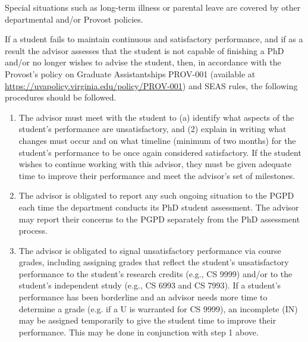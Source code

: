 Special situations such as long-term illness or parental leave are
covered by other departmental and/or Provost policies.

If a student fails to maintain continuous and satisfactory performance, 
and if as a result the advisor 
assesses that the student is not capable of finishing a PhD and/or no longer wishes to advise the student, then, in accordance with the Provost's policy
on Graduate Assistantships PROV-001 (available at
\href{https://uvapolicy.virginia.edu/policy/PROV-001}{{https://uvapolicy.virginia.edu/policy/PROV-001}})
and SEAS rules, the following procedures should be followed.

\begin{enumerate}
    \item 
The advisor must meet with the student to (a) identify what
aspects of the student's performance are unsatisfactory, and (2) explain
in writing what changes must occur and on what timeline (minimum of two
months) for the student's performance to be once again considered
satisfactory. If the student wishes to continue working with this
advisor, they must be given adequate time to improve their performance
and meet the advisor's set of milestones.

\item The advisor is obligated to report any such ongoing situation
to the PGPD each time the department
conducts its PhD student assessment. 
The advisor may report their concerns to the PGPD separately from the PhD assessment process.

\item 
The advisor is obligated to signal unsatisfactory performance via course grades, 
including assigning grades that reflect the student's unsatisfactory performance
to the student's research credits (e.g., CS 9999) and/or to the student's independent study (e.g., CS 6993 and CS 7993). 
If a student's performance has been borderline and an advisor needs more time to
determine a grade (e.g. if a U is warranted for CS 9999), 
an incomplete (IN) may be assigned temporarily to give the student time to improve their performance. This
may be done in conjunction with step 1 above.


\end{enumerate}
